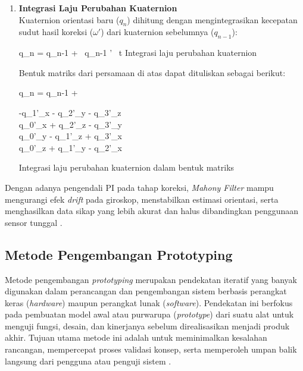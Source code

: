 \begin{enumerate}
	\item \textbf{Integrasi Laju Perubahan Kuaternion}\\
	Kuaternion orientasi baru ($q_n$) dihitung dengan mengintegrasikan kecepatan sudut hasil koreksi ($\omega'$) dari kuaternion sebelumnya ($q_{n-1}$):
	\begin{equationcaptioned}[eq:2.integrasiLajuPerubahanKuaternion]{
			q_{n} = q_{n-1} + \, q_{n-1} \circledtimes \omega' \, \Delta t
		}{
			Integrasi laju perubahan kuaternion \cite{MinhLongHoang2022}
		}
	\end{equationcaptioned}
	
	Bentuk matriks dari persamaan di atas dapat dituliskan sebagai berikut:
	\begin{equationcaptioned}[eq:2.integrasiLajuPerubahanKuaternionMatrix]{
			q_{n} = q_{n-1} + 
			\begin{pmatrix}
				-q_{1}\omega'_{x} - q_{2}\omega'_{y} - q_{3}\omega'_{z} \\
				q_{0}\omega'_{x} + q_{2}\omega'_{z} - q_{3}\omega'_{y} \\
				q_{0}\omega'_{y} - q_{1}\omega'_{z} + q_{3}\omega'_{x} \\
				q_{0}\omega'_{z} + q_{1}\omega'_{y} - q_{2}\omega'_{x}
			\end{pmatrix}
		}{
			Integrasi laju perubahan kuaternion dalam bentuk matriks \cite{MinhLongHoang2022}
		}
	\end{equationcaptioned}
\end{enumerate}

Dengan adanya pengendali PI pada tahap koreksi, \textit{Mahony Filter} mampu mengurangi efek \textit{drift} pada giroskop, menstabilkan estimasi orientasi, serta menghasilkan data sikap yang lebih akurat dan halus dibandingkan penggunaan sensor tunggal \cite{MinhLongHoang2022}.

\subsection{Metode Pengembangan Prototyping}

Metode pengembangan \textit{prototyping} merupakan pendekatan iteratif yang banyak digunakan dalam perancangan dan pengembangan sistem berbasis perangkat keras (\textit{hardware}) maupun perangkat lunak (\textit{software}). Pendekatan ini berfokus pada pembuatan model awal atau purwarupa (\textit{prototype}) dari suatu alat untuk menguji fungsi, desain, dan kinerjanya sebelum direalisasikan menjadi produk akhir. Tujuan utama metode ini adalah untuk meminimalkan kesalahan rancangan, mempercepat proses validasi konsep, serta memperoleh umpan balik langsung dari pengguna atau penguji sistem \cite{obaid2024prototype}.

